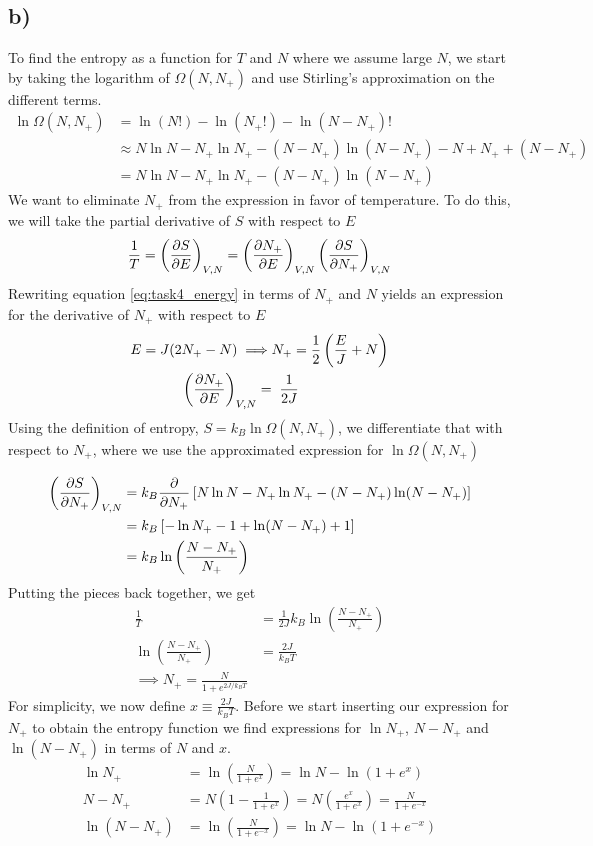 \documentclass[reprint,english,notitlepage,aps,nobalancelastpage,nofootinbib]{revtex4-1}
\newcommand{\closed}[1]{\left(#1\right)}
\newcommand{\bracket}[1]{\left[#1\right]}
\newcommand{\tmdv}[4]{\closed{\pdv{#1}{#2}}_{#3,#4}}
\newcommand{\np}{N_+}
\newcommand{\kb}{k_B}
\begin{document}
\subsection*{b)}
To find the entropy as a function for $T$ and $N$ where we assume large $N$, we start by taking the logarithm of $\Omega(N,\np)$ and use Stirling's approximation on the different terms. 
\begin{align*}
	\ln\Omega(N,\np) &= \ln(N!) - \ln(\np!)-\ln(N-\np)! \\ 
	&\approx N\ln N - \np \ln\np - (N-\np)\ln(N-\np) - N + \np + (N-\np) \\
	&=N\ln N - \np \ln\np - (N-\np)\ln(N-\np)
\end{align*}
We want to eliminate $\np$ from the expression in favor of temperature. To do this, we will take the partial derivative of $S$ with respect to $E$
\begin{align*}
	\frac{1}{T}=\tmdv{S}{E}{V}{N}=\tmdv{\np}{E}{V}{N}\tmdv{S}{\np}{V}{N}
\end{align*}
Rewriting equation \eqref{eq:task4_energy} in terms of $\np$ and $N$ yields an expression for the derivative of $\np$ with respect to $E$
\begin{align*}
	E = J(2\np-N) \implies& \np = \frac{1}{2}\closed{\frac{E}{J}+N} \\ 
	\tmdv{\np}{E}{V}{N} =&\;\; \frac{1}{2J}
\end{align*}
Using the definition of entropy, $S = \kb \ln\Omega(N,\np)$, we differentiate that with respect to $\np$, where we use the approximated expression for $\ln\Omega(N,\np)$

\begin{align*}
	\tmdv{S}{\np}{V}{N} &= \kb \pdv{\np}\bracket{N\ln N - \np\ln\np - (N-\np)\ln(N-\np)} \\ 
	&= \kb \bracket{-\ln\np - 1 + \ln(N-\np) + 1} \\ 
	&= \kb\ln\closed{\frac{N-\np}{\np}}
\end{align*}
Putting the pieces back together, we get 
\begin{align*}
	\frac{1}{T} &= \frac{1}{2J} \kb \ln\closed{\frac{N-\np}{\np}} \\ 
	\ln\closed{\frac{N-\np}{\np}} &=\frac{2J}{\kb T} \\ 
	\implies \np = \frac{N}{1+e^{2J/\kb T}}
\end{align*}
For simplicity, we now define $x\equiv \frac{2J}{\kb T}$. Before we start inserting our expression for $\np$ to obtain the entropy function we find expressions for $\ln\np$, $N-\np$ and $\ln(N-\np)$ in terms of $N$ and $x$. 
\begin{align*}
	\ln\np&=\ln\closed{\frac{N}{1+e^x}} = \ln N - \ln(1+e^x) \\ 
	N - \np &= N\closed{1 - \frac{1}{1+e^x}}=N\closed{\frac{e^x}{1+e^x}}=\frac{N}{1+e^{-x}} \\
	\ln(N-\np) &= \ln\closed{\frac{N}{1+e^{-x}}} = \ln N - \ln(1+e^{-x})
\end{align*}  
\end{document}
